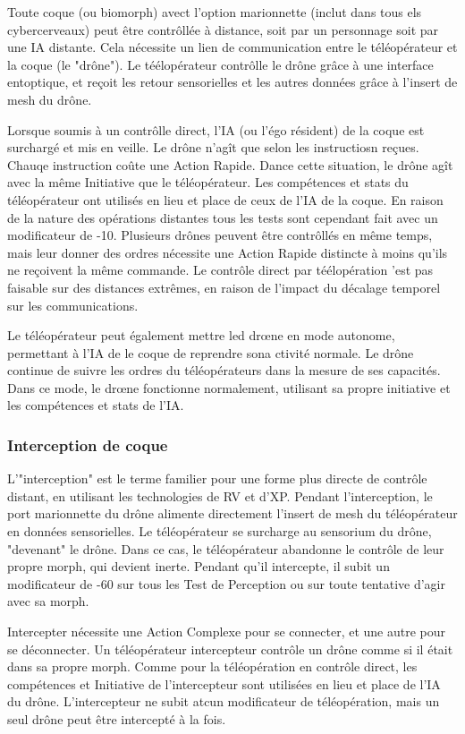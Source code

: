 Toute coque (ou biomorph) avect l'option marionnette (inclut dans tous els cybercerveaux) peut être contrôllée à distance, soit par un personnage soit par une IA distante. Cela nécessite un lien de communication entre le téléopérateur et la coque (le "drône"). Le téélopérateur contrôlle le drône grâce à une interface entoptique, et reçoit les retour sensorielles et les autres données grâce à l'insert de mesh du drône. 

Lorsque soumis à un contrôlle direct, l'IA (ou l'égo résident) de la coque est surchargé et mis en veille. Le drône n'agît que selon les instructiosn reçues. Chauqe instruction coûte une Action Rapide. Dance cette situation, le drône agît avec la même Initiative que le téléopérateur. Les compétences et stats du téléopérateur ont utilisés en lieu et place de ceux de l'IA de la coque. En raison de la nature des opérations distantes tous les tests sont cependant fait avec un modificateur de -10. Plusieurs drônes peuvent être contrôllés en même temps, mais leur donner des ordres nécessite une Action Rapide distincte à moins qu'ils ne reçoivent la même commande. Le contrôle direct par téélopération 'est pas faisable sur des distances extrêmes, en raison de l'impact du décalage temporel sur les communications. 

Le téléopérateur peut également mettre led drœne en mode autonome, permettant à l'IA de le coque de reprendre sona ctivité normale. Le drône continue de suivre les ordres du téléopérateurs dans la mesure de ses capacités. Dans ce mode, le drœne fonctionne normalement, utilisant sa propre initiative et les compétences et stats de l'IA. 

\subsubsection{Interception de  coque} 

L'"interception" est le terme familier pour une forme plus directe de contrôle distant, en utilisant les technologies de RV et d'XP. Pendant l'interception, le port marionnette du drône alimente directement l'insert de mesh du téléopérateur en données sensorielles. Le téléopérateur se surcharge au sensorium du drône, "devenant" le drône. Dans ce cas, le téléopérateur abandonne le contrôle de leur propre morph, qui devient inerte. Pendant qu'il intercepte, il subit un modificateur de -60 sur tous les Test de Perception ou sur toute tentative d'agir avec sa morph. 

Intercepter nécessite une Action Complexe pour se connecter, et une autre pour se déconnecter. Un téléopérateur intercepteur contrôle un drône comme si il était dans sa propre morph. Comme pour la téléopération en contrôle direct, les compétences et Initiative de l'intercepteur sont utilisées en lieu et place de l'IA du drône. L'intercepteur ne subit atcun modificateur de téléopération, mais un seul drône peut être intercepté à la fois. 

